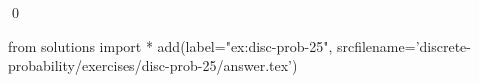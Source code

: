 
\begin{ex} 
  \label{ex:disc-prob-25}
  
  \qed
\end{ex} 
\begin{python0}
from solutions import *
add(label="ex:disc-prob-25",
    srcfilename='discrete-probability/exercises/disc-prob-25/answer.tex') 
\end{python0}
